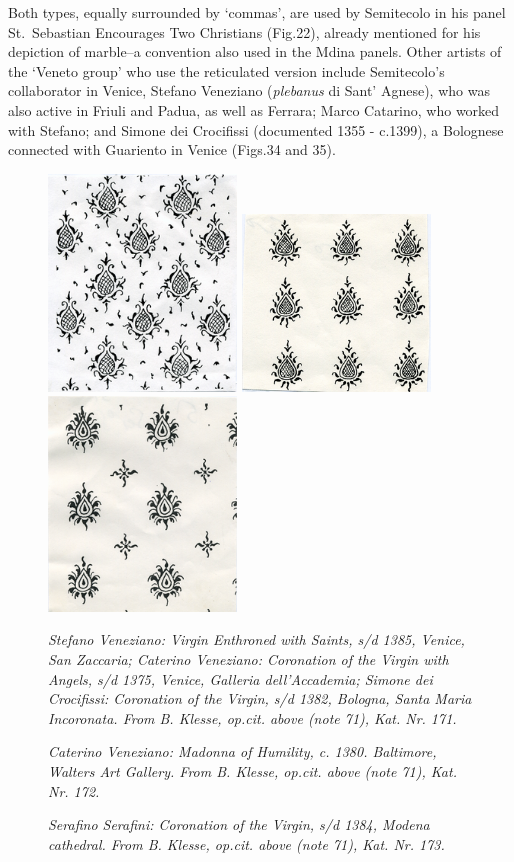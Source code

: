 \documentclass[a4paper,12pt]{article}
\begin{document}
Both types, equally surrounded by `commas', are used
by Semitecolo in his panel St.~Sebastian Encourages Two Christians
(Fig.22), already mentioned for his depiction of marble--a convention
also used in the Mdina panels.  Other artists of the `Veneto group'
who use the reticulated version include Semitecolo's collaborator in
Venice, Stefano Veneziano (\textit{plebanus} di Sant' Agnese), who was
also active in Friuli and Padua, as well as Ferrara; Marco Catarino,
who worked with Stefano; and Simone dei Crocifissi (documented 1355 -
c.1399), a Bolognese connected with Guariento in Venice (Figs.34 and
35). 
\begin{figure}[thbp]
\centering
\includegraphics[width=5cm]{pics/fig34.png}
\hfill
\includegraphics[width=5cm]{pics/fig35.png}
\hfill
\includegraphics[width=5cm]{pics/fig36.png}
\caption[Stefano Veneziano: Virgin Enthroned with Saints, s/d 1385] 
{\it Stefano Veneziano: Virgin Enthroned with Saints, s/d 1385, Venice, San
Zaccaria; Caterino Veneziano: Coronation of the Virgin with Angels,
s/d 1375, Venice, Galleria dell'Accademia; Simone dei Crocifissi:
Coronation of the Virgin, s/d 1382, Bologna, Santa Maria Incoronata.
From B. Klesse, op.cit. above (note 71), Kat. Nr. 171.}
\caption[Caterino Veneziano: Madonna of Humility, c. 1380] 
{\it Caterino Veneziano: Madonna of Humility, c. 1380.  Baltimore, Walters
Art Gallery.  From B. Klesse, op.cit. above (note 71), Kat. Nr. 172.}
\caption[Serafino Serafini: Coronation of the Virgin, s/d 1384] 
{\it Serafino Serafini: Coronation of the Virgin, s/d 1384, Modena
cathedral.  From B. Klesse, op.cit. above (note 71), Kat. Nr. 173.}
\end{figure}
\end{document}
